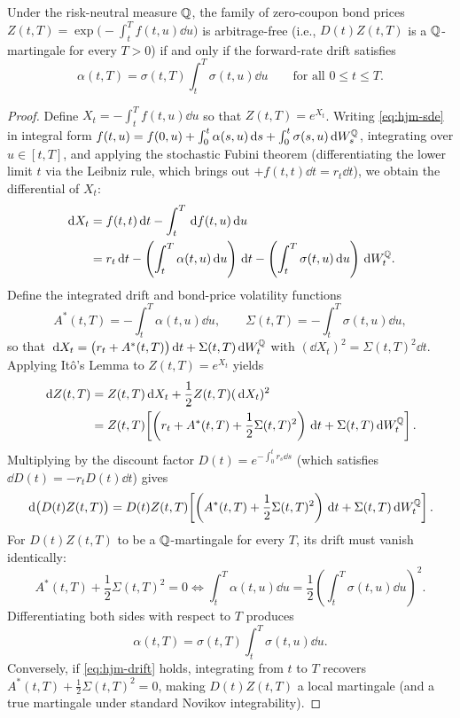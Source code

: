 \begin{theorem}\label{thm:hjm-drift}
    Under the risk-neutral measure $\mathbb{Q}$, the family of zero-coupon bond prices $Z(t, T) = \exp\bigl(-\int_t^T f(t, u)\dd u\bigr)$ is arbitrage-free (i.e., $D(t)Z(t, T)$ is a $\mathbb{Q}$-martingale for every $T > 0$) if and only if the forward-rate drift satisfies
    \begin{equation}\label{eq:hjm-drift}
    \alpha(t, T) = \sigma(t, T)\int_t^T \sigma(t, u)\dd u \qquad \text{for all } 0 \leq t \leq T.
    \end{equation}
\end{theorem}
\begin{proof}
    Define $X_t = -\int_t^T f(t, u)\dd u$ so that $Z(t, T) = e^{X_t}$. Writing \eqref{eq:hjm-sde} in integral form $f(t, u) = f(0, u) + \int_0^t \alpha(s, u)\,\mathrm{d} s + \int_0^t \sigma(s, u)\,\mathrm{d} W_s^{\mathbb{Q}}$, integrating over $u \in [t, T]$, and applying the stochastic Fubini theorem (differentiating the lower limit $t$ via the Leibniz rule, which brings out $+f(t, t)\dd t = r_t\dd t$), we obtain the differential of $X_t$:
    \begin{align*}
    \,\mathrm{d} X_t &= f(t, t)\,\mathrm{d} t - \int_t^T \,\mathrm{d} f(t, u)\,\mathrm{d} u \\
    &= r_t\,\mathrm{d} t - \left(\int_t^T \alpha(t, u)\,\mathrm{d} u\right)\,\mathrm{d} t - \left(\int_t^T \sigma(t, u)\,\mathrm{d} u\right)\,\mathrm{d} W_t^{\mathbb{Q}}.
    \end{align*}
    Define the integrated drift and bond-price volatility functions
    \[
    A^*(t, T) = -\int_t^T \alpha(t, u)\dd u, \qquad \Sigma(t, T) = -\int_t^T \sigma(t, u)\dd u,
    \]
    so that $\,\mathrm{d} X_t = \bigl(r_t + A^*(t, T)\bigr)\,\mathrm{d} t + \Sigma(t, T)\,\mathrm{d} W_t^{\mathbb{Q}}$ with $(\dd X_t)^2 = \Sigma(t, T)^2\dd t$. Applying It\^o's Lemma to $Z(t, T) = e^{X_t}$ yields
    \begin{align*}
    \,\mathrm{d} Z(t, T) &= Z(t, T)\,\mathrm{d} X_t + \frac{1}{2}Z(t, T)(\,\mathrm{d} X_t)^2 \\
    &= Z(t, T)\!\left[\left(r_t + A^*(t, T) + \frac{1}{2}\Sigma(t, T)^2\right)\,\mathrm{d} t + \Sigma(t, T)\,\mathrm{d} W_t^{\mathbb{Q}}\right].
    \end{align*}
    Multiplying by the discount factor $D(t) = e^{-\int_0^t r_s\dd s}$ (which satisfies $\dd D(t) = -r_t D(t)\dd t$) gives
    \[
    \,\mathrm{d}\bigl(D(t)Z(t, T)\bigr) = D(t)Z(t, T)\!\left[\left(A^*(t, T) + \frac{1}{2}\Sigma(t, T)^2\right)\,\mathrm{d} t + \Sigma(t, T)\,\mathrm{d} W_t^{\mathbb{Q}}\right].
    \]
    For $D(t)Z(t, T)$ to be a $\mathbb{Q}$-martingale for every $T$, its drift must vanish identically:
    \[
    A^*(t, T) + \frac{1}{2}\Sigma(t, T)^2 = 0 \iff \int_t^T \alpha(t, u)\dd u = \frac{1}{2}\left(\int_t^T \sigma(t, u)\dd u\right)^2.
    \]
    Differentiating both sides with respect to $T$ produces
    \[
    \alpha(t, T) = \sigma(t, T)\int_t^T \sigma(t, u)\dd u.
    \]
    Conversely, if \eqref{eq:hjm-drift} holds, integrating from $t$ to $T$ recovers $A^*(t, T) + \frac{1}{2}\Sigma(t, T)^2 = 0$, making $D(t)Z(t, T)$ a local martingale (and a true martingale under standard Novikov integrability).
\end{proof}
